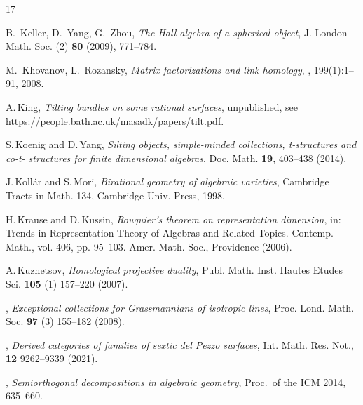 \documentclass[a4paper,11pt, reqno]{amsart}
\theoremstyle{plain}
\theoremstyle{definition}
\numberwithin{equation}{section}
\begin{document}
\begin{thebibliography}{17}

 B.~Keller, D.~Yang, G.~Zhou, \emph{The Hall algebra of a spherical object}, J. London Math.
Soc. (2) \textbf{80} (2009), 771--784.

M.~Khovanov, L.~Rozansky,
\newblock \emph{Matrix factorizations and link homology},
, 199(1):1--91, 2008.


A.\,King, \textit{Tilting bundles on some rational surfaces}, unpublished, see \url{https://people.bath.ac.uk/masadk/papers/tilt.pdf}. 

S.\,Koenig and D.\,Yang,
\emph{Silting objects, simple-minded collections, t-structures and co-t-
structures for finite dimensional algebras},
Doc. Math. \textbf{19}, 403--438 (2014).

J.\,Koll\'ar and S.\,Mori,
\emph{Birational geometry of algebraic varieties},
Cambridge Tracts in Math.
134, Cambridge Univ. Press, 1998.


H.\,Krause and D.\,Kussin, 
{\it Rouquier's theorem on representation dimension}, 
in: Trends in
Representation Theory of Algebras and Related Topics. 
Contemp. Math., vol. 406, pp.
95--103. Amer. Math. Soc., Providence (2006).

A.\,Kuznetsov, 
{\it Homological projective duality}, 
Publ. Math. Inst. Hautes Etudes Sci. \textbf{105} (1) 157--220 (2007).

\bysame ,
{\it Exceptional collections for Grassmannians of isotropic lines}, 
Proc. Lond. Math. Soc. \textbf{97} (3) 155--182 (2008).


\bysame, 
\emph{Derived categories of families of sextic del Pezzo surfaces},
Int. Math. Res. Not.,
\textbf{12} 9262--9339 (2021).

 \bysame, \emph{Semiorthogonal decompositions in algebraic geometry}, Proc.~of the ICM 2014, 635--660.


\end{thebibliography}
\end{document}

